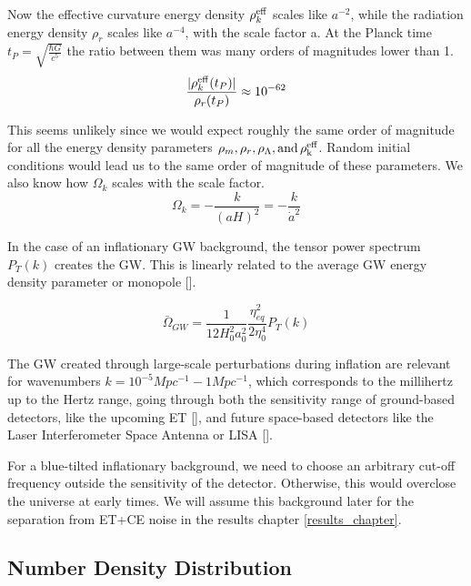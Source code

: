 Now the effective curvature energy density $\rho_{k}^{\rm{eff}}$ scales like $a^{-2}$, while the radiation energy density $\rho_{r}$ scales like $a^{-4}$, with the scale factor a.
At the Planck time $t_P = \sqrt{\frac{\hbar G}{c^5}}$ the ratio between them was many orders of magnitudes lower than 1.
\begin{equation}
    \frac{|\rho_k^{\rm{eff}}(t_P)|}{\rho_r(t_P)} \approx 10^{-62}
\end{equation}

This seems unlikely since we would expect roughly the same order of magnitude for all the energy density parameters $\rho_m, \rho_r, \rho_\Lambda, \rm{ and } \, \rho_k^{eff}$. Random initial conditions would lead us to the same order of magnitude of these parameters.
We also know how $\Omega_k$ scales with the scale factor.
\begin{equation}
    \Omega_k = - \frac{k}{(aH)^2}= -\frac{k}{\dot{a}^2}
\end{equation}

In the case of an inflationary GW background, the tensor power spectrum $P_T(k)$ creates the GW. This is linearly related to the average GW energy density parameter or monopole [\cite{schulze_gw_class_2023}].

\begin{equation}
    \bar{\Omega}_{GW} = \frac{1}{12 H_0^2 a_0^2} \frac{\eta_{eq}^2}{2\eta_0^4} P_T(k)
\end{equation}

The GW created through large-scale perturbations during inflation are relevant for wavenumbers $k=10^{-5} Mpc^{-1} -1 Mpc^{-1}$, which corresponds to the millihertz up to the Hertz range, going through both the sensitivity range of ground-based detectors, like the upcoming ET [\cite{alonso_noise_2020}], and future space-based detectors like the Laser Interferometer Space Antenna or LISA [\cite{robson_construction_2019}].

For a blue-tilted inflationary background, we need to choose an arbitrary cut-off frequency outside the sensitivity of the detector. Otherwise, this would overclose the universe at early times. We will assume this background later for the separation from ET+CE noise in the results chapter \ref{results_chapter}.


\subsection{Number Density Distribution}

